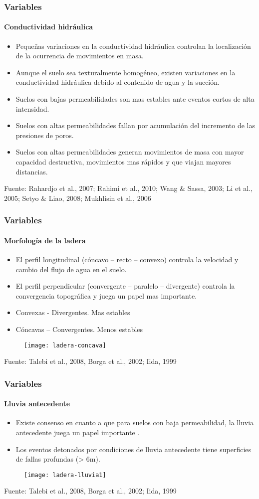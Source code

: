 \documentclass[12pt]{beamer}
\begin{document}
\begin{frame}
\frametitle{Variables}
\framesubtitle{Conductividad hidráulica}
\scriptsize{
\begin{itemize} 
\item Pequeñas variaciones en la conductividad hidráulica controlan la localización de la ocurrencia de movimientos en masa.
\vfill
\item Aunque el suelo sea texturalmente homogéneo, existen variaciones en la conductividad hidráulica debido al contenido de agua y la succión.
\vfill
\item Suelos con bajas permeabilidades son mas estables ante eventos cortos de alta intensidad. 
\vfill
\item Suelos con altas permeabilidades fallan por acumulación del incremento de las presiones de poros.
\vfill
\item Suelos con altas permeabilidades generan movimientos de masa con mayor capacidad destructiva, movimientos mas rápidos y que viajan mayores distancias.
\end{itemize}
}
\vfill
\tiny{Fuente: Rahardjo et al., 2007; Rahimi et al., 2010; Wang \& Sassa, 2003; Li et al., 2005; Setyo \& Liao, 2008; Mukhlisin et al., 2006
}
\end{frame}
\begin{frame}
\frametitle{Variables}
\framesubtitle{Morfología de la ladera}
\scriptsize{
\begin{itemize} 
\item El perfil longitudinal (cóncavo – recto – convexo) controla la velocidad y cambio del flujo de agua en el suelo.
\vfill
\item El perfil perpendicular (convergente – paralelo – divergente) controla la convergencia topográfica y juega un papel mas importante. 
\vfill
\item Convexas - Divergentes. Mas estables
\vfill
\item Cóncavas – Convergentes. Menos estables
\end{itemize}
}
\vfill
\begin{figure}
\centering
\texttt{[image: ladera-concava]} 
\end{figure}
\tiny{Fuente: Talebi et al., 2008, Borga et al., 2002; Iida, 1999}
\end{frame}
\begin{frame}
\frametitle{Variables}
\framesubtitle{Lluvia antecedente}
\scriptsize{
\begin{itemize} 
\item Existe consenso en cuanto a que para suelos con baja permeabilidad, la lluvia antecedente juega un papel importante .
\vfill
\item Los eventos detonados por condiciones de lluvia antecedente tiene superficies de fallas profundas (> 6m).
\end{itemize}
}
\vfill
\begin{figure}
\centering
\texttt{[image: ladera-lluvia1]} 
\end{figure}
\tiny{Fuente: Talebi et al., 2008, Borga et al., 2002; Iida, 1999}
\end{frame}
\end{document}
